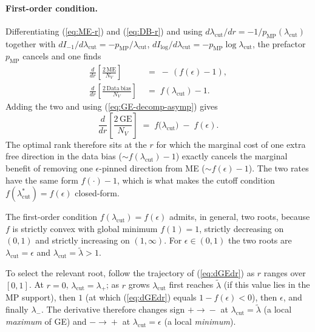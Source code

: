 \documentclass[11pt,a4paper]{article}
\theoremstyle{definition}
\theoremstyle{remark}
\newcommand{\NV}{N_V}
\begin{document}
\paragraph{First-order condition.}
Differentiating (\ref{eq:ME-r}) and (\ref{eq:DB-r}) and using
$d\lambda_{\mathrm{cut}}/dr = -1/p_{\mathrm{MP}}(\lambda_{\mathrm{cut}})$
together with
$dI_{-1}/d\lambda_{\mathrm{cut}} = -p_{\mathrm{MP}}/\lambda_{\mathrm{cut}}$,
$dI_{\log}/d\lambda_{\mathrm{cut}} = -p_{\mathrm{MP}}\log\lambda_{\mathrm{cut}}$,
the prefactor $p_{\mathrm{MP}}$ cancels and one finds
\begin{align}
  \frac{d}{dr}\!\left[\frac{2\,\mathrm{ME}}{\NV}\right]
  &\;=\;
  -\,(f(\epsilon) - 1),
  \nonumber \\
  \frac{d}{dr}\!\left[\frac{2\,\mathrm{Data\ bias}}{\NV}\right]
  &\;=\;
  f(\lambda_{\mathrm{cut}}) - 1 .
  \label{eq:dME-dDB}
\end{align}
Adding the two and using
(\ref{eq:GE-decomp-asymp}) gives
\begin{equation}
  \frac{d}{dr}\!\left[\frac{2\,\mathrm{GE}}{\NV}\right]
  \;=\;
  f\!\big(\lambda_{\mathrm{cut}}\big) \;-\; f(\epsilon).
  \label{eq:dGEdr}
\end{equation}
The optimal rank therefore sits at the $r$ for which the
marginal cost of one extra free direction in the data bias
($\sim f(\lambda_{\mathrm{cut}}) - 1$) exactly cancels the
marginal benefit of removing one $\epsilon$-pinned direction from ME
($\sim f(\epsilon) - 1$). The two rates have the same form
$f(\cdot) - 1$, which is what makes the cutoff condition
$f(\lambda_{\mathrm{cut}}^{*}) = f(\epsilon)$ closed-form.

The first-order condition $f(\lambda_{\mathrm{cut}}) = f(\epsilon)$
admits, in general, two roots, because $f$ is strictly convex with
global minimum $f(1) = 1$, strictly decreasing on $(0,1)$ and
strictly increasing on $(1,\infty)$. For $\epsilon \in (0,1)$ the
two roots are $\lambda_{\mathrm{cut}} = \epsilon$ and
$\lambda_{\mathrm{cut}} = \widetilde{\lambda} > 1$.

To select the relevant root, follow the trajectory of
(\ref{eq:dGEdr}) as $r$ ranges over $[0,1]$. At $r = 0$,
$\lambda_{\mathrm{cut}} = \lambda_{+}$; as $r$ grows
$\lambda_{\mathrm{cut}}$ first reaches $\widetilde{\lambda}$ (if
this value lies in the MP support), then $1$ (at which
(\ref{eq:dGEdr}) equals $1 - f(\epsilon) < 0$), then $\epsilon$,
and finally $\lambda_{-}$. The derivative therefore changes sign
$+\!\to\!-$ at $\lambda_{\mathrm{cut}} = \widetilde{\lambda}$
(a local \emph{maximum} of GE) and $-\!\to\!+$ at
$\lambda_{\mathrm{cut}} = \epsilon$ (a local \emph{minimum}).
\end{document}
